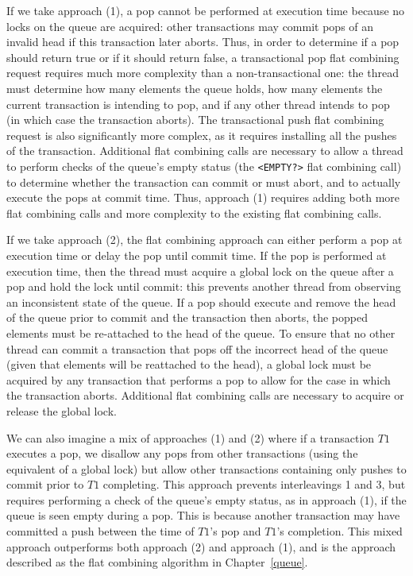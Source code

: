 If we take approach (1), a pop cannot be performed at execution time because no locks on the queue are acquired: other transactions may commit pops of an invalid head if this transaction later aborts. Thus, in order to determine if a pop should return true or if it should return false, a transactional pop flat combining request requires much more complexity than a non-transactional one: the thread must determine how many elements the queue holds, how many elements the current transaction is intending to pop, and if any other thread intends to pop (in which case the transaction aborts). The transactional push flat combining request is also significantly more complex, as it requires installing all the pushes of the transaction. Additional flat combining calls are necessary to allow a thread to perform checks of the queue's empty status (the \texttt{<EMPTY?>} flat combining call) to determine whether the transaction can commit or must abort, and to actually execute the pops at commit time. Thus, approach (1) requires adding both more flat combining calls and more complexity to the existing flat combining calls.

If we take approach (2), the flat combining approach can either perform a pop at execution time or delay the pop until commit time. If the pop is performed at execution time, then the thread must acquire a global lock on the queue after a pop and hold the lock until commit: this prevents another thread from observing an inconsistent state of the queue. If a pop should execute and remove the head of the queue prior to commit and the transaction then aborts, the popped elements must be re-attached to the head of the queue. To ensure that no other thread can commit a transaction that pops off the incorrect head of the queue (given that elements will be reattached to the head), a global lock must be acquired by any transaction that performs a pop to allow for the case in which the transaction aborts. Additional flat combining calls are necessary to acquire or release the global lock. 

We can also imagine a mix of approaches (1) and (2) where if a transaction $T1$ executes a pop, we disallow any pops from other transactions (using the equivalent of a global lock) but allow other transactions containing only pushes to commit prior to $T1$ completing. This approach prevents interleavings 1 and 3, but requires performing a check of the queue's empty status, as in approach (1), if the queue is seen empty during a pop. This is because another transaction may have committed a push between the time of $T1$'s pop and $T1$'s completion. This mixed approach outperforms both approach (2) and approach (1), and is the approach described as the flat combining algorithm in Chapter~\ref{queue}. 

